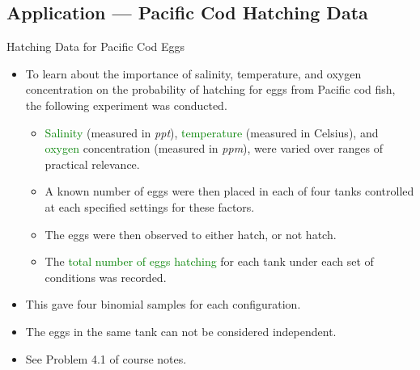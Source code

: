 \documentclass[oneside]{book}\usepackage[]{graphicx}\usepackage[svgnames]{xcolor}
\begin{document}
\subsection*{Application --- Pacific Cod Hatching Data}
\begin{Example}{Hatching Data for Pacific Cod Eggs}
    \begin{itemize}
        \item To learn about the importance of salinity, temperature, and oxygen concentration
              on the probability of hatching for eggs from Pacific cod fish, the following
              experiment was conducted.
              \begin{itemize}
                  \item \textcolor{Green}{Salinity} (measured in \emph{ppt}), \textcolor{Green}{temperature} (measured in Celsius), and \textcolor{Green}{oxygen}
                        concentration (measured in \emph{ppm}), were varied over ranges of practical relevance.
                  \item A known number of eggs were then placed in each of four tanks controlled at each
                        specified settings for these factors.
                  \item The eggs were then observed to either hatch, or not hatch.
                  \item The \textcolor{Green}{total number of eggs hatching} for each tank under each set of conditions was
                        recorded.
              \end{itemize}
        \item This gave four binomial samples for each configuration.
        \item The eggs in the same tank can not be considered independent.
        \item See Problem 4.1 of course notes.
    \end{itemize}
\end{Example}
\end{document}
